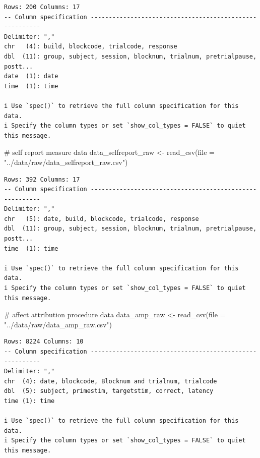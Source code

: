 \documentclass[
  letterpaper,
  DIV=11,
  numbers=noendperiod]{scrreprt}
\newenvironment{Shaded}{\begin{snugshade}}{\end{snugshade}}
\newcommand{\AttributeTok}[1]{\textcolor[rgb]{0.40,0.45,0.13}{#1}}
\newcommand{\CommentTok}[1]{\textcolor[rgb]{0.37,0.37,0.37}{#1}}
\newcommand{\FunctionTok}[1]{\textcolor[rgb]{0.28,0.35,0.67}{#1}}
\newcommand{\NormalTok}[1]{\textcolor[rgb]{0.00,0.23,0.31}{#1}}
\newcommand{\OtherTok}[1]{\textcolor[rgb]{0.00,0.23,0.31}{#1}}
\newcommand{\StringTok}[1]{\textcolor[rgb]{0.13,0.47,0.30}{#1}}
\begin{document}
\begin{verbatim}
Rows: 200 Columns: 17
-- Column specification --------------------------------------------------------
Delimiter: ","
chr   (4): build, blockcode, trialcode, response
dbl  (11): group, subject, session, blocknum, trialnum, pretrialpause, postt...
date  (1): date
time  (1): time

i Use `spec()` to retrieve the full column specification for this data.
i Specify the column types or set `show_col_types = FALSE` to quiet this message.
\end{verbatim}

\begin{Shaded}
\begin{Highlighting}[]
\CommentTok{\# self report measure data}
\NormalTok{data\_selfreport\_raw }\OtherTok{\textless{}{-}} \FunctionTok{read\_csv}\NormalTok{(}\AttributeTok{file =} \StringTok{"../data/raw/data\_selfreport\_raw.csv"}\NormalTok{) }
\end{Highlighting}
\end{Shaded}

\begin{verbatim}
Rows: 392 Columns: 17
-- Column specification --------------------------------------------------------
Delimiter: ","
chr   (5): date, build, blockcode, trialcode, response
dbl  (11): group, subject, session, blocknum, trialnum, pretrialpause, postt...
time  (1): time

i Use `spec()` to retrieve the full column specification for this data.
i Specify the column types or set `show_col_types = FALSE` to quiet this message.
\end{verbatim}

\begin{Shaded}
\begin{Highlighting}[]
\CommentTok{\# affect attribution procedure data}
\NormalTok{data\_amp\_raw }\OtherTok{\textless{}{-}} \FunctionTok{read\_csv}\NormalTok{(}\AttributeTok{file =} \StringTok{"../data/raw/data\_amp\_raw.csv"}\NormalTok{)}
\end{Highlighting}
\end{Shaded}

\begin{verbatim}
Rows: 8224 Columns: 10
-- Column specification --------------------------------------------------------
Delimiter: ","
chr  (4): date, blockcode, Blocknum and trialnum, trialcode
dbl  (5): subject, primestim, targetstim, correct, latency
time (1): time

i Use `spec()` to retrieve the full column specification for this data.
i Specify the column types or set `show_col_types = FALSE` to quiet this message.
\end{verbatim}
\end{document}
